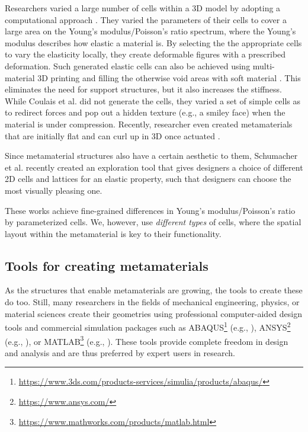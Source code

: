 {Researchers varied a large number of cells within a 3D model by adopting a computational approach \cite{Panetta2015, Schumacher2015, Panetta2017, Chen2018a}. They varied the parameters of their cells to cover a large area on the Young's modulus\slash Poisson's ratio spectrum, where the Young's modulus describes how elastic a material is. By selecting the the appropriate cells to vary the elasticity locally, they create deformable figures with a prescribed deformation. Such generated elastic cells can also be achieved using multi-material 3D printing and filling the otherwise void areas with soft material \cite{Zhu2017}. This eliminates the need for support structures, but it also increases the stiffness. While Coulais et al. \cite{Coulais2016} did not generate the cells, they varied a set of simple cells as to redirect forces and pop out a hidden texture (e.g., a smiley face) when the material is under compression. Recently, researcher even created metamaterials that are initially flat and can curl up in 3D once actuated \cite{Ou2018}.



Since metamaterial structures also have a certain aesthetic to them, Schumacher et al. \cite{Schumacher2018} recently created an exploration tool that gives designers a choice of different 2D cells and lattices for an elastic property, such that designers can choose the most visually pleasing one.

These works achieve fine-grained differences in Young's modulus\slash Poisson's ratio by parameterized cells. We, however, use \textit{different types} of cells, where the spatial layout within the metamaterial is key to their functionality. 


\subsection{Tools for creating metamaterials}

As the structures that enable metamaterials are growing, the tools to create these do too. Still, many researchers in the fields of mechanical engineering, physics, or material sciences create their geometries using professional computer-aided design tools and commercial simulation packages such as ABAQUS\footnote{\url{https://www.3ds.com/products-services/simulia/products/abaqus/}} (e.g., \cite{Jiang2018, Feng2017, Overvelde2014, Shan2015, Mankame2004, Meza2015}), ANSYS\footnote{\url{https://www.ansys.com/}} (e.g., \cite{Wang2001, Rosen2007}), or MATLAB\footnote{\url{https://www.mathworks.com/products/matlab.html}} (e.g., \cite{Wang2001, Beharic2014, Mankame2004}). These tools provide complete freedom in design and analysis and are thus preferred by expert users in research.

}
